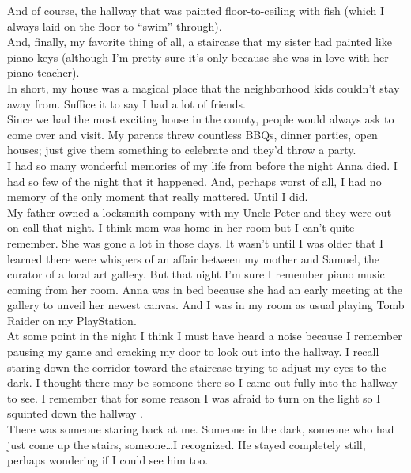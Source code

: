 \documentclass[a5paper]{scrartcl}
\begin{document}
And of course, the hallway that was painted floor-to-ceiling with fish (which I always laid on the floor to \enquote{swim} through).\\


And, finally, my favorite thing of all, a staircase that my sister had painted like piano keys (although I'm pretty sure it's only because she was in love with her piano teacher). \\


In short, my house was a magical place that the neighborhood kids couldn't stay away from. Suffice it to say I had a lot of friends.\\


Since we had the most exciting house in the county, people would always ask to come over and visit. My parents threw countless BBQs, dinner parties, open houses; just give them something to celebrate and they'd throw a party. \\


I had so many wonderful memories of my life from before the night Anna died. I had so few of the night that it happened. And, perhaps worst of all, I had no memory of the only moment that really mattered. Until I did. \\


My father owned a locksmith company with my Uncle Peter and they were out on call that night. I think mom was home in her room but I can't quite remember.  She was gone a lot in those days. It wasn't until I was older that I learned there were whispers of an affair between my mother and Samuel, the curator of a local art gallery. But that night I'm sure I remember piano music coming from her room. Anna was in bed because she had an early meeting at the gallery to unveil her newest canvas. And I was in my room as usual playing Tomb Raider on my PlayStation. \\


At some point in the night I think I must have heard a noise because I remember pausing my game and cracking my door to look out into the hallway. I recall staring down the corridor toward the staircase trying to adjust my eyes to the dark. I thought there may be someone there so I came out fully into the hallway to see. I remember that for some reason I was afraid to turn on the light so I squinted down the hallway .\\


There was someone staring back at me. Someone in the dark, someone who had just come up the stairs, someone\dots I recognized. He stayed completely still, perhaps wondering if I could see him too. \\
\end{document}
